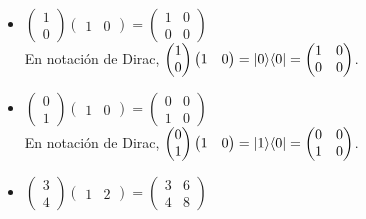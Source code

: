 \documentclass[osajnl,preprint,showpacs,superscriptaddress,10pt]{revtex4-1} %
\DeclarePairedDelimiter\bra{\langle}{\rvert}
\DeclarePairedDelimiter\ket{\lvert}{\rangle}
\begin{document}
\begin{itemize}
    \item $\begin{pmatrix}1 \\ 0\end{pmatrix}\begin{pmatrix}1 & 0\end{pmatrix} = \begin{pmatrix}1 & 0 \\ 0 & 0\end{pmatrix}$ \\
    
    En notación de Dirac, $\begin{pmatrix}1 \\ 0\end{pmatrix}\begin{pmatrix}1 & 0\end{pmatrix} = \ket{0}\bra{0} = \begin{pmatrix}1 & 0 \\ 0 & 0\end{pmatrix}$.
    
    \item $\begin{pmatrix}0 \\ 1\end{pmatrix}\begin{pmatrix}1 & 0\end{pmatrix} = \begin{pmatrix}0 & 0 \\ 1 & 0\end{pmatrix}$ \\
    
    En notación de Dirac, $\begin{pmatrix}0 \\ 1\end{pmatrix}\begin{pmatrix}1 & 0\end{pmatrix} = \ket{1}\bra{0} = \begin{pmatrix}0 & 0 \\ 1 & 0\end{pmatrix}$.
    
    \item $\begin{pmatrix}3 \\ 4\end{pmatrix}\begin{pmatrix}1 & 2\end{pmatrix} = \begin{pmatrix}3 & 6 \\ 4 & 8\end{pmatrix}$ \\
    

\end{itemize}
\end{document}
